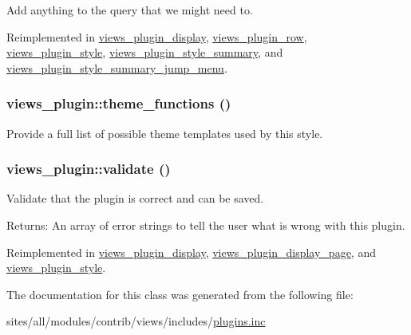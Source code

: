 Add anything to the query that we might need to. 

Reimplemented in \hyperlink{classviews__plugin__display_efdc473b5cbe1c7eb4d0f5175d02184a}{views\_\-plugin\_\-display}, \hyperlink{classviews__plugin__row_bfc5a6936d485f19d49cfd9eae094f8f}{views\_\-plugin\_\-row}, \hyperlink{classviews__plugin__style_f6b601d8f42cc3d86721fcad76eaae4b}{views\_\-plugin\_\-style}, \hyperlink{classviews__plugin__style__summary_fd8f02a61bd0e1887cc7767950e8e0df}{views\_\-plugin\_\-style\_\-summary}, and \hyperlink{classviews__plugin__style__summary__jump__menu_ee2a45ee02a7ce8d041a5b028758cf0b}{views\_\-plugin\_\-style\_\-summary\_\-jump\_\-menu}.\hypertarget{classviews__plugin_b20d2d49f24db9ee7f162341564fd2fd}{
\subsubsection[{theme\_\-functions}]{\setlength{\rightskip}{0pt plus 5cm}views\_\-plugin::theme\_\-functions ()}}
\label{classviews__plugin_b20d2d49f24db9ee7f162341564fd2fd}


Provide a full list of possible theme templates used by this style. \hypertarget{classviews__plugin_af004b6a719837f08a1ffe4a1cf4d442}{
\subsubsection[{validate}]{\setlength{\rightskip}{0pt plus 5cm}views\_\-plugin::validate ()}}
\label{classviews__plugin_af004b6a719837f08a1ffe4a1cf4d442}


Validate that the plugin is correct and can be saved.

\begin{Desc}
\item[Returns:]An array of error strings to tell the user what is wrong with this plugin. \end{Desc}


Reimplemented in \hyperlink{classviews__plugin__display_3282edb1b32b756937fe2d0c8757c80c}{views\_\-plugin\_\-display}, \hyperlink{classviews__plugin__display__page_995cf48d67e20ef897d931fcbba391d1}{views\_\-plugin\_\-display\_\-page}, and \hyperlink{classviews__plugin__style_41929fec27cb0ae7a801276969a080a1}{views\_\-plugin\_\-style}.

The documentation for this class was generated from the following file:\begin{CompactItemize}
\item 
sites/all/modules/contrib/views/includes/\hyperlink{plugins_8inc}{plugins.inc}\end{CompactItemize}
